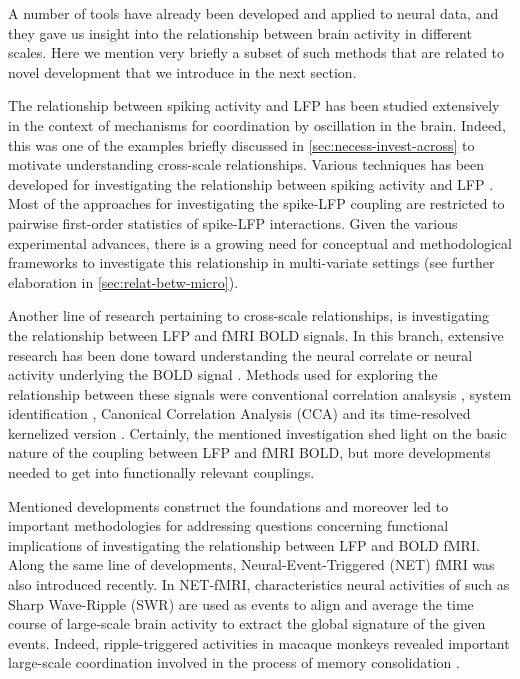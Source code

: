 A number of tools have  already been developed and applied to neural data, and they
gave us insight into the relationship between brain activity in different scales.
Here we mention very briefly a subset of such methods that are related to novel development that we introduce in the next section.


The relationship between spiking activity and LFP has been studied extensively in the context of mechanisms for coordination by oscillation in the brain.
Indeed, this was one of the examples briefly discussed in \autoref{sec:necess-invest-across} to motivate understanding cross-scale relationships.
Various techniques has been developed for investigating the relationship between spiking activity and LFP
\citep{zeitlerAssessingNeuronalCoherence2006,ashidaProcessingPhaseLockedSpikes2010,vinckPairwisePhaseConsistency2010,vinckImprovedMeasuresPhasecoupling2012,jiangMeasuringDirectionalityNeuronal2015,liUnbiasedRobustQuantification2016,zareiIntroducingComprehensiveFramework2018}.
Most of the approaches for investigating the spike-LFP coupling are restricted to pairwise first-order statistics of spike-LFP interactions.
Given the various experimental advances, there is a growing need for conceptual and methodological frameworks to investigate this relationship in multi-variate settings
(see further elaboration in \autoref{sec:relat-betw-micro}).


Another line of research pertaining to cross-scale relationships,
is investigating the relationship between LFP and fMRI BOLD signals.
In this branch,
extensive research has been done toward understanding the neural correlate
or neural activity underlying the BOLD signal
\cite{logothetisNeurophysiologicalInvestigationBasis2001,logothetisUnderpinningsBOLDFunctional2003,logothetisWhatWeCan2008,goenseNeurophysiologyBOLDFMRI2008a,zaldivarDopamineinducedDissociationBOLD2014}.
Methods used for exploring the relationship between these signals were
conventional correlation analsysis \cite{logothetisNeurophysiologicalInvestigationBasis2001},
system identification \cite{logothetisNeurophysiologicalInvestigationBasis2001},
Canonical Correlation Analysis (CCA) and its time-resolved kernelized version \cite{biessmannTemporalKernelCCA2009,murayamaRelationshipNeuralHemodynamic2010}.
Certainly, the mentioned investigation shed light on the basic nature of the coupling between LFP and fMRI BOLD, but more developments needed to get into functionally relevant couplings.


Mentioned developments construct the foundations and moreover led to important methodologies for addressing questions concerning functional implications of investigating the relationship between LFP and BOLD fMRI.
Along the same line of developments, Neural-Event-Triggered (NET) fMRI was also introduced recently. 
In NET-fMRI, characteristics neural activities of such as Sharp Wave-Ripple (SWR) are used as events to align and average the time course of large-scale brain activity to extract the global signature of the given events.
Indeed, ripple-triggered activities in macaque monkeys revealed important large-scale coordination involved in the process of memory consolidation \cite{logothetisHippocampalCorticalInteraction2012}.

